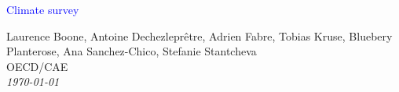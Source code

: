 



%
              





\begin{frame}
\thispagestyle{empty}
\begin{center}
\begin{LARGE}
\textcolor{blue}{Climate survey}
\end{LARGE}

\vspace{1cm}


Laurence Boone, Antoine Dechezleprêtre, Adrien Fabre, Tobias Kruse, Bluebery Planterose, Ana Sanchez-Chico, Stefanie Stantcheva \\

OECD/CAE \\

\textit{\today} 

\end{center}

\bigskip

\end{frame}


